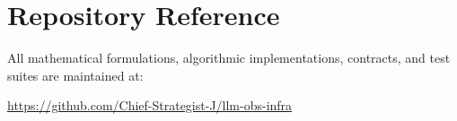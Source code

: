 \documentclass[11pt,a4paper]{article}
\theoremstyle{definition}
\begin{document}
\section{Repository Reference}
All mathematical formulations, algorithmic implementations, contracts, and test suites are maintained at:
\begin{center}
\url{https://github.com/Chief-Strategist-J/llm-obs-infra}
\end{center}
\end{document}
